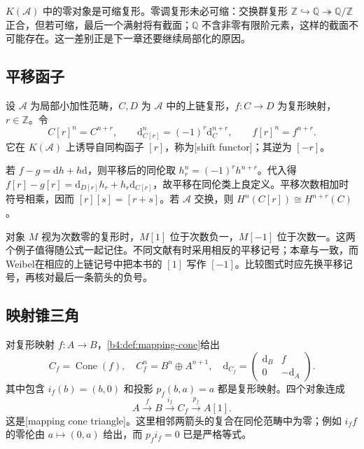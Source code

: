 \(K(\mathcal A)\) 中的零对象是可缩复形。零调复形未必可缩：交换群复形 \(\mathbb Z\hookrightarrow\mathbb Q\twoheadrightarrow\mathbb Q/\mathbb Z\) 正合，但若可缩，最后一个满射将有截面；\(\mathbb Q\) 不含非零有限阶元素，这样的截面不可能存在。这一差别正是下一章还要继续局部化的原因。

\subsection{平移函子}
\label{b4:subsec:1601:02}

\begin{definition}\label{b4:def:homotopy-shift}
设 \(\mathcal A\) 为局部小加性范畴，\(C,D\) 为 \(\mathcal A\) 中的上链复形，\(f:C\to D\) 为复形映射，\(r\in\mathbb Z\)。令
\[
 C[r]^n=C^{n+r},\qquad \mathrm{d}_{C[r]}^n=(-1)^r \mathrm{d}_C^{n+r},\qquad
 f[r]^n=f^{n+r}.
\]
它在 \(K(\mathcal A)\) 上诱导自同构函子 \([r]\)，称为[shift functor]；其逆为 \([-r]\)。
\end{definition}

若 \(f-g=\mathrm{d}h+h\mathrm{d}\)，则平移后的同伦取 \(h_r^n=(-1)^r h^{n+r}\)。代入得 \(f[r]-g[r]=\mathrm{d}_{D[r]}h_r+h_r\mathrm{d}_{C[r]}\)，故平移在同伦类上良定义。平移次数相加时符号相乘，因而 \([r][s]=[r+s]\)。若 \(\mathcal A\) 交换，则 \(H^n(C[r])\cong H^{n+r}(C)\)。

\ProseParagraphBreak
对象 \(M\) 视为次数零的复形时，\(M[1]\) 位于次数负一，\(M[-1]\) 位于次数一。这两个例子值得随公式一起记住。不同文献有时采用相反的平移记号；本章与一致，而 Weibel\cite[Sections 10.1--10.2]{Weibel1994HomologicalAlgebra}在相应的上链记号中把本书的 \([1]\) 写作 \([-1]\)。比较图式时应先换平移记号，再核对最后一条箭头的负号。

\subsection{映射锥三角}
\label{b4:subsec:1601:03}

对复形映射 \(f:A\to B\)，\cref{b4:def:mapping-cone}给出
\[
 C_f=\operatorname{Cone}(f),\quad C_f^n=B^n\oplus A^{n+1},\quad
 \mathrm{d}_{C_f}=\begin{pmatrix}\mathrm{d}_B&f\\0&-\mathrm{d}_A\end{pmatrix}.
\]
其中包含 \(i_f(b)=(b,0)\) 和投影 \(p_f(b,a)=a\) 都是复形映射。四个对象连成
\[
 A\xrightarrow{f}B\xrightarrow{i_f}C_f\xrightarrow{p_f}A[1].
\]
这是[mapping cone triangle]。这里相邻两箭头的复合在同伦范畴中为零；例如 \(i_ff\) 的零伦由 \(a\mapsto(0,a)\) 给出，而 \(p_fi_f=0\) 已是严格等式。

